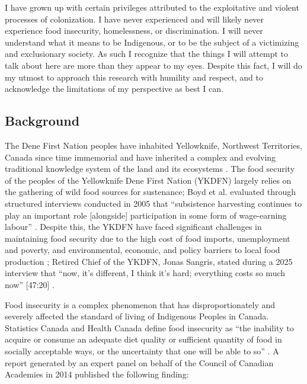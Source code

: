 \documentclass{report}
\begin{document}
\hspace{24pt} I have grown up with certain privileges attributed to the exploitative and violent processes of colonization. I have never experienced and will likely never experience food insecurity, homelessness, or discrimination. I will never understand what it means to be Indigenous, or to be the subject of a victimizing and exclusionary society. As such I recognize that the things I will attempt to talk about here are more than they appear to my eyes. Despite this fact, I will do my utmost to approach this research with humility and respect, and to acknowledge the limitations of my perspective as best I can.

\clearpage

\subsection{Background}

\hspace{24pt} The Dene First Nation peoples have inhabited Yellowknife, Northwest Territories, Canada since time immemorial and have inherited a complex and evolving traditional knowledge system of the land and its ecosystems \parencite{lorecapturingtraditional}.
The food security of the peoples of the Yellowknife Dene First Nation (YKDFN) largely relies on the gathering of wild food sources for sustenance;
Boyd et al. evaluated through structured interviews conducted in 2005 that ``subsistence harvesting continues to play an important role [alongside] participation in some form of wage-earning labour'' \parencite[268]{socialculturalcapital}.
Despite this, the YKDFN have faced significant challenges in maintaining food security due to the high cost of food imports, unemployment and poverty, and environmental, economic, and policy barriers to local food production \parencite{resilientcommunities};
Retired Chief of the YKDFN, Jonas Sangris, stated during a 2025 interview that ``now, it's different, I think it's hard; everything costs so much now'' [47:20] \parencite{jonassangris}.

\hspace{24pt} Food insecurity is a complex phenomenon that has disproportionately and severely affected the standard of living of Indigenous Peoples in Canada.
Statistics Canada and Health Canada define food insecurity as ``the inability to acquire or consume an adequate diet quality or sufficient quantity of food in socially acceptable ways, or the uncertainty that one will be able to so'' \parencite[para. 2]{statscanfoodinsecurity}.
A report generated by an expert panel on behalf of the Council of Canadian Academies in 2014 published the following finding:
\end{document}
